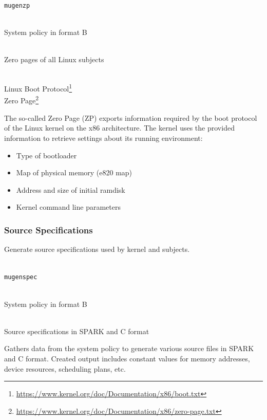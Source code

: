 \documentclass[a4paper,twoside,titlepage]{article}
\begin{document}
\begin{description} \itemsep1pt \parskip0pt
	\item[Name] \hfill \\
		\texttt{mugenzp}
	\item[Input] \hfill \\
		System policy in format B
	\item[Output] \hfill \\
		Zero pages of all Linux subjects
	\item[Output format] \hfill \\
		Linux Boot Protocol\footnote{\url{https://www.kernel.org/doc/Documentation/x86/boot.txt}} \\
		Zero Page\footnote{\url{https://www.kernel.org/doc/Documentation/x86/zero-page.txt}}
\end{description}

The so-called Zero Page (ZP) exports information required by the boot protocol
of the Linux kernel on the x86 architecture. The kernel uses the provided
information to retrieve settings about its running environment:
\begin{itemize}
	\item Type of bootloader
	\item Map of physical memory (e820 map)
	\item Address and size of initial ramdisk
	\item Kernel command line parameters
\end{itemize}

\subsubsection{Source Specifications}
\label{sec:tools-gen-spec}
Generate source specifications used by kernel and subjects.

\begin{description} \itemsep1pt \parskip0pt
	\item[Name] \hfill \\
		\texttt{mugenspec}
	\item[Input] \hfill \\
		System policy in format B
	\item[Output] \hfill \\
		Source specifications in SPARK and C format
\end{description}

Gathers data from the system policy to generate various source files in SPARK
and C format. Created output includes constant values for memory addresses,
device resources, scheduling plans, etc.
\end{document}

